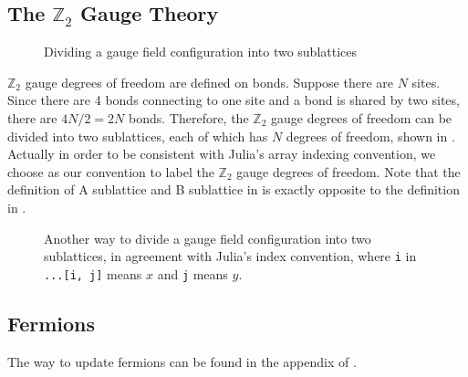 \documentclass[hyperref, a4paper]{article}
\newcommand*{\Ztwo}{$\mathbb{Z}_2$ }
\begin{document}
\subsection{The \Ztwo Gauge Theory}

\begin{figure}
    \centering
    
    \caption{Dividing a gauge field configuration into two sublattices}
    \label{fig:z2-dividing}
\end{figure}

\Ztwo gauge degrees of freedom are defined on bonds. 
Suppose there are $N$ sites. Since there are 4 bonds connecting to one site and a bond is shared by two sites,
there are $4 N / 2 = 2 N$ bonds.
Therefore, the \Ztwo gauge degrees of freedom can be divided into two sublattices, each of which has $N$ degrees of freedom, shown in .
Actually in order to be consistent with Julia's array indexing convention, we choose  as our convention to label the \Ztwo gauge degrees of freedom.
Note that the definition of A sublattice and B sublattice in  is exactly opposite to the definition in .

\begin{figure}
    \centering
    
    \caption{Another way to divide a gauge field configuration into two sublattices, in agreement with Julia's index convention, where \texttt{i} in \texttt{...[i, j]} means $x$ and \texttt{j} means $y$.}
    \label{fig:z2-dividing-real}
\end{figure}

\subsection{Fermions}

The way to update fermions can be found in the appendix of \cite{Chen_2021}.


 
\end{document}
